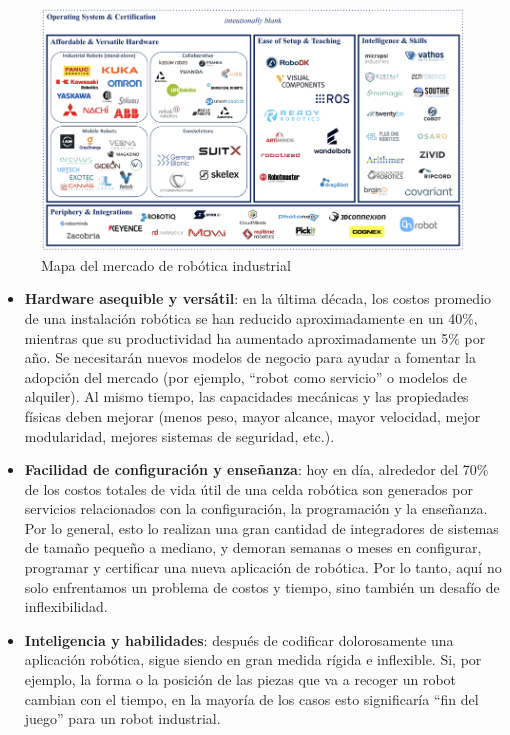     \newpage
    
    \begin{figure}[H]
        \centering
        \includegraphics[width=1.0\linewidth]{Main/Chapter2/Images2/empresas-robotica.png}
        \caption{Mapa del mercado de robótica industrial \cite{pauventures}}
        \label{f:Cap2_general_empresas_robotica}
    \end{figure}
    
    \begin{itemize}
        \item{ \textbf{Hardware asequible y versátil}: en la última década, los costos promedio de una instalación robótica se han reducido aproximadamente en un 40\%, mientras que su productividad ha aumentado aproximadamente un 5\% por año. Se necesitarán nuevos modelos de negocio para ayudar a fomentar la adopción del mercado (por ejemplo, ``robot como servicio'' o modelos de alquiler). Al mismo tiempo, las capacidades mecánicas y las propiedades físicas deben mejorar (menos peso, mayor alcance, mayor velocidad, mejor modularidad, mejores sistemas de seguridad, etc.).}
        \item{ \textbf{Facilidad de configuración y enseñanza}: hoy en día, alrededor del 70\% de los costos totales de vida útil de una celda robótica son generados por servicios relacionados con la configuración, la programación y la enseñanza. Por lo general, esto lo realizan una gran cantidad de integradores de sistemas de tamaño pequeño a mediano, y demoran semanas o meses en configurar, programar y certificar una nueva aplicación de robótica. Por lo tanto, aquí no solo enfrentamos un problema de costos y tiempo, sino también un desafío de inflexibilidad. }
        \item {\textbf{Inteligencia y habilidades}: después de codificar dolorosamente una aplicación robótica, sigue siendo en gran medida rígida e inflexible. Si, por ejemplo, la forma o la posición de las piezas que va a recoger un robot cambian con el tiempo, en la mayoría de los casos esto significaría ``fin del juego'' para un robot industrial. }
    \end{itemize}

